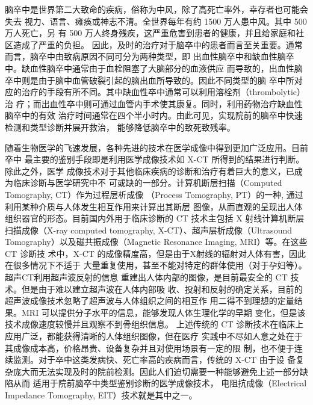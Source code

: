 


脑卒中是世界第二大致命的疾病，俗称为中风，除了高死亡率外，幸存者也可能会失去
视力、语言、瘫痪或神志不清。全世界每年有约 1500 万人患中风。其中 500 万人死亡，另
有 500 万人终身残疾，这严重危害到患者的健康，并且给家庭和社区造成了严重的负担。
因此，及时的治疗对于脑卒中的患者而言至关重要。通常而言，脑卒中由致病原因不同可分为两种类型，即
出血性脑卒中和缺血性脑卒中。缺血性脑卒中通常由于血栓阻塞了大脑部分的血液供应
而导致的，出血性脑卒中则是由于脑中血管破裂引起的脑出血所导致的。因此不同类型的脑
卒中所对应的治疗的手段有所不同。其中缺血性卒中通常可以利用溶栓剂（thrombolytic）治
疗；而出血性卒中则可通过血管内手术使其康复。同时，利用药物治疗缺血性脑卒中的有效
治疗时间通常在四个半小时内。由此可见，实现院前的脑卒中快速检测和类型诊断并展开救治，
能够降低脑卒中的致死致残率。

随着生物医学的飞速发展，各种先进的技术在医学成像中得到更加广泛应用。目前卒中
最主要的鉴别手段即是利用医学成像技术如 X-CT 所得到的结果进行判断。除此之外，医学
成像技术对于其他临床疾病的诊断和治疗有着巨大的意义，已成为临床诊断与医学研究中不
可或缺的一部分。计算机断层扫描（Computed Tomography, CT）作为过程层析成像
（Process Tomography, PT）的一种, 通过利用某种介质与人体发生相互作用来计算出其断层
图像，从而直观的呈现出人体组织器官的形态。目前国内外用于临床诊断的 CT 技术主包括
X 射线计算机断层扫描成像（X-ray computed tomography, X-CT）、超声层析成像（Ultrasound
Tomography）以及磁共振成像（Magnetic Resonance Imaging, MRI）等。在这些 CT 诊断技
术中，X-CT 的成像精度高，但是由于X射线的辐射对人体有害，因此在很多情况下不适于
大量重复使用，甚至不能对特定的群体使用（对于孕妇等）。超声CT利用超声波反射的信息
重建出人体内部的图像，是目前最安全的 CT 技术。但是由于难以建立超声波在人体内部吸
收、投射和反射的确定关系，目前的超声波成像技术忽略了超声波与人体组织之间的相互作
用二得不到理想的定量结果。MRI 可以提供分子水平的信息，能够发现人体生理化学的早期
变化，但是该技术成像速度较慢并且观察不到骨组织信息。
上述传统的 CT 诊断技术在临床上应用广泛，都能获得清晰的人体组织图像，但在医疗
实践中不尽如人意之处在于其成像成本高，价格昂贵、设备复杂并且对使用场景有一定的限
制，也不便于连续监测。对于卒中这类发病快、死亡率高的疾病而言，传统的 X-CT 由于设
备复杂庞大而无法实现及时的院前检测。因此人们迫切需要一种能够避免上述一部分缺陷从而
适用于院前脑卒中类型鉴别诊断的医学成像技术，
电阻抗成像（Electrical Impedance Tomography, EIT）技术就是其中之一。

